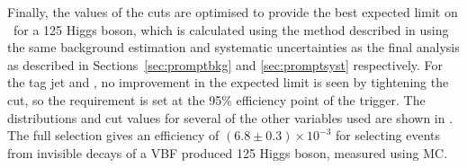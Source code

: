 Finally, the values of the cuts are optimised to provide the best expected limit on \BRinv\, for a 125 \GeV Higgs boson, which is calculated using the method described in  using the same background estimation and systematic uncertainties as the final analysis as described in Sections~\ref{sec:promptbkg} and \ref{sec:promptsyst} respectively. For the tag jet \pt and \METnoMU, no improvement in the expected limit is seen by tightening the cut, so the requirement is set at the 95\% efficiency point of the trigger. The distributions and cut values for several of the other variables used are shown in . The full selection gives an efficiency of $(6.8\pm 0.3)\times 10^{-3}$ for selecting events from invisible decays of a VBF produced 125 \GeV Higgs boson, measured using \ac{MC}.  

